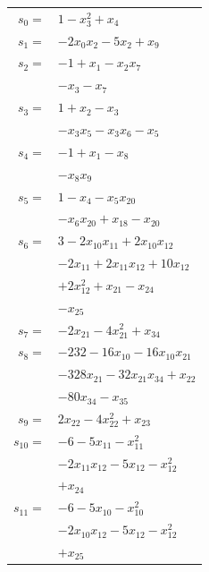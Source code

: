 \begingroup
\small
\setlength{\tabcolsep}{2pt}
\setlength{\LTleft}{0pt}
\begin{longtable}{@{}r@{\;}l@{}}
\(s_{0}=\) & \(\displaystyle 1 -x_{3}^{2} +x_{4}\) \\[3pt]
\(s_{1}=\) & \(\displaystyle -2x_{0}x_{2} -5x_{2} +x_{9}\) \\[3pt]
\(s_{2}=\) & \(\displaystyle -1 +x_{1} -x_{2}x_{7}\) \\
 & \(\displaystyle -x_{3} -x_{7}\) \\[3pt]
\(s_{3}=\) & \(\displaystyle 1 +x_{2} -x_{3}\) \\
 & \(\displaystyle -x_{3}x_{5} -x_{3}x_{6} -x_{5}\) \\[3pt]
\(s_{4}=\) & \(\displaystyle -1 +x_{1} -x_{8}\) \\
 & \(\displaystyle -x_{8}x_{9}\) \\[3pt]
\(s_{5}=\) & \(\displaystyle 1 -x_{4} -x_{5}x_{20}\) \\
 & \(\displaystyle -x_{6}x_{20} +x_{18} -x_{20}\) \\[3pt]
\(s_{6}=\) & \(\displaystyle 3 -2x_{10}x_{11} +2x_{10}x_{12}\) \\
 & \(\displaystyle -2x_{11} +2x_{11}x_{12} +10x_{12}\) \\
 & \(\displaystyle +2x_{12}^{2} +x_{21} -x_{24}\) \\
 & \(\displaystyle -x_{25}\) \\[3pt]
\(s_{7}=\) & \(\displaystyle -2x_{21} -4x_{21}^{2} +x_{34}\) \\[3pt]
\(s_{8}=\) & \(\displaystyle -232 -16x_{10} -16x_{10}x_{21}\) \\
 & \(\displaystyle -328x_{21} -32x_{21}x_{34} +x_{22}\) \\
 & \(\displaystyle -80x_{34} -x_{35}\) \\[3pt]
\(s_{9}=\) & \(\displaystyle 2x_{22} -4x_{22}^{2} +x_{23}\) \\[3pt]
\(s_{10}=\) & \(\displaystyle -6 -5x_{11} -x_{11}^{2}\) \\
 & \(\displaystyle -2x_{11}x_{12} -5x_{12} -x_{12}^{2}\) \\
 & \(\displaystyle +x_{24}\) \\[3pt]
\(s_{11}=\) & \(\displaystyle -6 -5x_{10} -x_{10}^{2}\) \\
 & \(\displaystyle -2x_{10}x_{12} -5x_{12} -x_{12}^{2}\) \\
 & \(\displaystyle +x_{25}\) \\[3pt]

\end{longtable}
